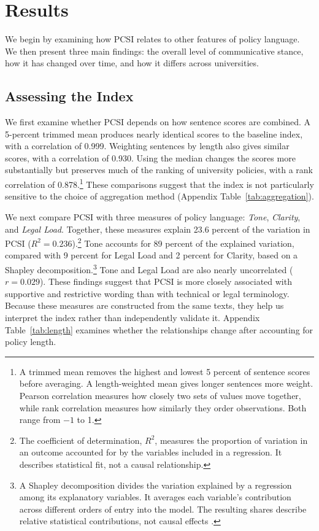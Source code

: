 \documentclass[11pt]{article}
\begin{document}

\section{Results}\label{sec:results}

We begin by examining how PCSI relates to other features of policy language. We then present three main findings: the overall level of communicative stance, how it has changed over time, and how it differs across universities.

\subsection{Assessing the Index}\label{sec:captures}

We first examine whether PCSI depends on how sentence scores are combined. A 5-percent trimmed mean produces nearly identical scores to the baseline index, with a correlation of 0.999. Weighting sentences by length also gives similar scores, with a correlation of 0.930. Using the median changes the scores more substantially but preserves much of the ranking of university policies, with a rank correlation of 0.878.\footnote{A trimmed mean removes the highest and lowest 5 percent of sentence scores before averaging. A length-weighted mean gives longer sentences more weight. Pearson correlation measures how closely two sets of values move together, while rank correlation measures how similarly they order observations. Both range from $-1$ to 1.} These comparisons suggest that the index is not particularly sensitive to the choice of aggregation method (Appendix Table~\ref{tab:aggregation}).

We next compare PCSI with three measures of policy language: \emph{Tone}, \emph{Clarity}, and \emph{Legal Load}. Together, these measures explain 23.6 percent of the variation in PCSI ($R^2=0.236$).\footnote{The coefficient of determination, $R^2$, measures the proportion of variation in an outcome accounted for by the variables included in a regression. It describes statistical fit, not a causal relationship.} Tone accounts for 89 percent of the explained variation, compared with 9 percent for Legal Load and 2 percent for Clarity, based on a Shapley decomposition.\footnote{A Shapley decomposition divides the variation explained by a regression among its explanatory variables. It averages each variable's contribution across different orders of entry into the model. The resulting shares describe relative statistical contributions, not causal effects \citep{groemping2006relative}.} Tone and Legal Load are also nearly uncorrelated ($r=0.029$). These findings suggest that PCSI is more closely associated with supportive and restrictive wording than with technical or legal terminology. Because these measures are constructed from the same texts, they help us interpret the index rather than independently validate it. Appendix Table~\ref{tab:length} examines whether the relationships change after accounting for policy length.
\end{document}
